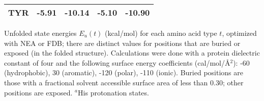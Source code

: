 \documentclass[a4paper,12pt]{article}
\begin{document}
\begin{table}[h]
\begin{center}
\begin{tabular}{ccccc}
TYR                    &  -5.91  &  -10.14  &   -5.10     &  -10.90  \\ \hline
\end{tabular}
\end{center}
{\footnotesize \noindent Unfolded state energies $E_u(t)$ (kcal/mol) for each amino acid type $t$, optimized with
NEA or FDB; there are distinct values for positions that are buried or exposed (in the folded structure). Calculations
were done with a protein dielectric constant of four and the following surface energy coefficients (cal/mol/\AA$^2$):
-60 (hydrophobic), 30 (aromatic), -120 (polar), -110 (ionic). Buried positions are those with a fractional solvent
accessible surface area of less than 0.30; other positions are exposed. $^a$His protonation states.
}
\end{table}
\end{document}
